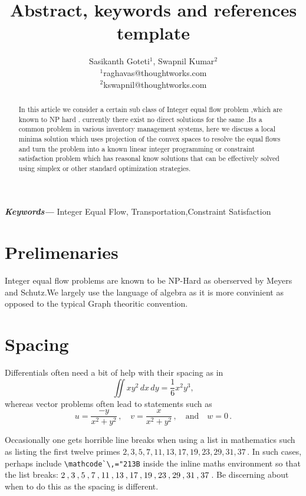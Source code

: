 \documentclass[a4paper]{article}
\title{Abstract, keywords and references template}
\author{Sasikanth Goteti$^{1}$, Swapnil Kumar$^{2}$  \\
            \small $^{1}$raghavas@thoughtworks.com \\
            \small $^{2}$kswapnil@thoughtworks.com \\
    }
\date{} %
\providecommand{\keywords}[1]
    {
      \small	
      \textbf{\textit{Keywords---}} #1
    }
\begin{document}
    \maketitle
    
    \begin{abstract}
        In this article we consider a certain sub class of Integer equal flow problem ,which are known to NP hard \cite{meyers}. 
        currently there exist no direct solutions for the same .Its a common problem in various inventory management systems,
        here we discuss a local minima solution which uses projection of the convex spaces to resolve the equal flows and turn 
        the problem into a known linear integer programming or constraint satisfaction problem which has reasonal know solutions that can be 
        effectively solved using simplex or other standard optimization strategies.
       \end{abstract}
       \keywords{Integer Equal Flow, Transportation,Constraint Satisfaction}
     
       \maketitle
    

    
    
    
    \section{Prelimenaries}
    Integer equal flow problems are known to be NP-Hard as oberserved by Meyers and Schutz\cite{meyers}.We largely use the
    language of algebra as it is more convinient as opposed to the typical Graph theoritic convention. 
    
    
    
    
    
    
    \section{Spacing}
    
    Differentials often need a bit of help with their spacing as in
    \[
        \iint xy^2\,dx\,dy 
        =\frac{1}{6}x^2y^3,
    \]
    whereas vector problems often lead to statements such as
    \[
        u=\frac{-y}{x^2+y^2}\,,\quad
        v=\frac{x}{x^2+y^2}\,,\quad\text{and}\quad
        w=0\,.
    \]

    Occasionally one gets horrible line breaks when using a list in mathematics such as 
    listing the first twelve primes  \(2,3,5,7,11,13,17,19,23,29,31,37\)\,.
    In such cases, perhaps include \verb|\mathcode`\,="213B| inside the inline maths environment so that the list breaks: \(\mathcode`\,="213B 2,3,5,7,11,13,17,19,23,29,31,37\)\,.
    Be discerning about when to do this as the spacing is different.
    
\end{document}

